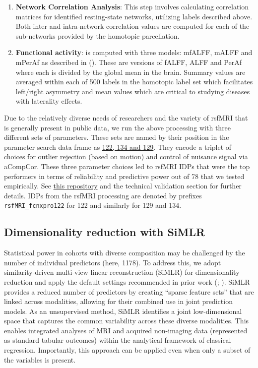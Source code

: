 \documentclass[
  table]{article}
\begin{document}
\begin{enumerate}
\item
  \textbf{Network Correlation Analysis}: This step involves calculating
  correlation matrices for identified resting-state networks, utilizing
  labels described above. Both inter and intra-network correlation
  values are computed for each of the sub-networks provided by the
  homotopic parcellation.
\item
  \textbf{Functional activity}: is computed with three models: mfALFF,
  mALFF and mPerAf as described in (). These are versions of fALFF, ALFF and PerAf where each
  is divided by the global mean in the brain. Summary values are
  averaged within each of 500 labels in the homotopic label set which
  facilitates left/right asymmetry and mean values which are critical to
  studying diseases with laterality effects.
\end{enumerate}

Due to the relatively diverse needs of researchers and the variety of
rsfMRI that is generally present in public data, we run the above
processing with three different sets of parameters. These sets are named
by their position in the parameter search data frame as
\href{https://github.com/ANTsX/ANTsPyMM/blob/0d987b7c56d2d24a4a24ccb71dbb93d51157ff05/antspymm/mm.py\#L6596-L6605}{122,
134 and 129}. They encode a triplet of choices for outlier rejection
(based on motion) and control of nuisance signal via aCompCor. These
three parameter choices led to rsfMRI IDPs that were the top performers
in terms of reliability and predictive power out of 78 that we tested
empirically. See
\href{https://github.com/stnava/antspymm_reproducibility}{this
repository} and the technical validation section for further details.
IDPs from the rsfMRI processing are denoted by prefixes
\texttt{rsfMRI\_fcnxpro122} for 122 and similarly for 129 and 134.

\subsection{Dimensionality reduction with
SiMLR}\label{dimensionality-reduction-with-simlr}

Statistical power in cohorts with diverse composition may be challenged
by the number of individual predictors (here, 1178). To address this, we
adopt similarity-driven multi-view linear reconstruction (SiMLR) for
dimensionality reduction and apply the default settings recommended in
prior work (; ). SiMLR provides a reduced number of predictors by creating
``sparse feature sets'' that are linked across modalities, allowing for
their combined use in joint prediction models. As an unsupervised
method, SiMLR identifies a joint low-dimensional space that captures the
common variability across these diverse modalities. This enables
integrated analyses of MRI and acquired non-imaging data (represented as
standard tabular outcomes) within the analytical framework of classical
regression. Importantly, this approach can be applied even when only a
subset of the variables is present.
\end{document}
